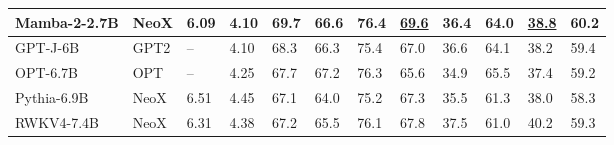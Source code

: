 \documentclass{article}
\begin{document}
\begin{table}[ht]
{\begin{tabular}{@{}llllllllllll@{}}
      \textbf{Mamba-2-2.7B} & NeoX        & \textbf{6.09}              & \textbf{4.10}              & \textbf{69.7}             & \textbf{66.6}              & \textbf{76.4}             & \underline{69.6}          & \textbf{36.4}                         & \textbf{64.0}                           & \underline{38.8}                        & \textbf{60.2} \\
      \midrule
      GPT-J-6B              & GPT2        & --                         & 4.10                       & 68.3                      & 66.3                       & 75.4                      & 67.0                      & 36.6                                  & 64.1                                    & 38.2                                    & 59.4 \\
      OPT-6.7B              & OPT         & --                         & 4.25                       & 67.7                      & 67.2                       & 76.3                      & 65.6                      & 34.9                                  & 65.5                                    & 37.4                                    & 59.2 \\
      Pythia-6.9B           & NeoX        & 6.51                       & 4.45                       & 67.1                      & 64.0                       & 75.2                      & 67.3                      & 35.5                                  & 61.3                                    & 38.0                                    & 58.3 \\
      RWKV4-7.4B            & NeoX        & 6.31                       & 4.38                       & 67.2                      & 65.5                       & 76.1                      & 67.8                      & 37.5                                  & 61.0                                    & 40.2                                    & 59.3 \\
      \bottomrule
    \end{tabular}
  }
  \label{table:downstream_zeroshot_full}
\end{table}
\end{document}
